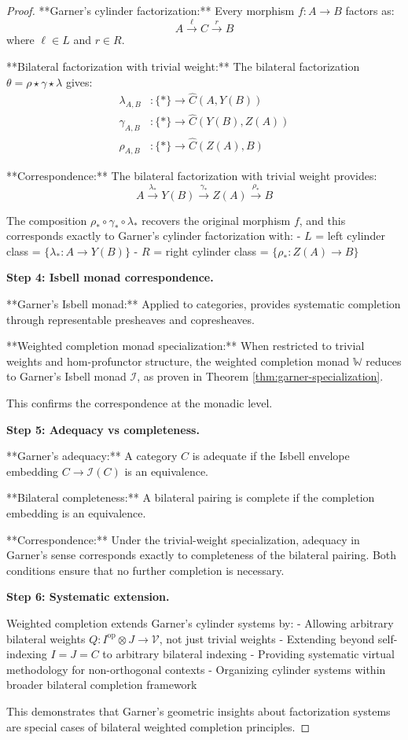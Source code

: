 \documentclass[11pt]{article}
\theoremstyle{plain}
\theoremstyle{definition}
\theoremstyle{remark}
\newcommand{\V}{\mathcal{V}}
\newcommand{\op}{\mathrm{op}}
\newcommand{\wh}[1]{\widehat{#1}}
\begin{document}
\begin{proof}
**Garner's cylinder factorization:** Every morphism $f : A \to B$ factors as:
$$A \xrightarrow{\ell} C \xrightarrow{r} B$$
where $\ell \in L$ and $r \in R$.

**Bilateral factorization with trivial weight:** The bilateral factorization $\theta = \rho \star \gamma \star \lambda$ gives:
\begin{align}
\lambda_{A,B} &: \{*\} \to \wh{C}(A, Y(B)) \\
\gamma_{A,B} &: \{*\} \to \wh{C}(Y(B), Z(A)) \\
\rho_{A,B} &: \{*\} \to \wh{C}(Z(A), B)
\end{align}

**Correspondence:** The bilateral factorization with trivial weight provides:
$$A \xrightarrow{\lambda_*} Y(B) \xrightarrow{\gamma_*} Z(A) \xrightarrow{\rho_*} B$$

The composition $\rho_* \circ \gamma_* \circ \lambda_*$ recovers the original morphism $f$, and this corresponds exactly to Garner's cylinder factorization with:
- $L$ = left cylinder class = $\{\lambda_* : A \to Y(B)\}$
- $R$ = right cylinder class = $\{\rho_* : Z(A) \to B\}$

\textbf{Step 4: Isbell monad correspondence.}

**Garner's Isbell monad:** Applied to categories, provides systematic completion through representable presheaves and copresheaves.

**Weighted completion monad specialization:** When restricted to trivial weights and hom-profunctor structure, the weighted completion monad $\mathbb{W}$ reduces to Garner's Isbell monad $\mathcal{I}$, as proven in Theorem \ref{thm:garner-specialization}.

This confirms the correspondence at the monadic level.

\textbf{Step 5: Adequacy vs completeness.}

**Garner's adequacy:** A category $C$ is adequate if the Isbell envelope embedding $C \to \mathcal{I}(C)$ is an equivalence.

**Bilateral completeness:** A bilateral pairing is complete if the completion embedding is an equivalence.

**Correspondence:** Under the trivial-weight specialization, adequacy in Garner's sense corresponds exactly to completeness of the bilateral pairing. Both conditions ensure that no further completion is necessary.

\textbf{Step 6: Systematic extension.}

Weighted completion extends Garner's cylinder systems by:
- Allowing arbitrary bilateral weights $Q : I^{\op} \otimes J \to \V$, not just trivial weights
- Extending beyond self-indexing $I = J = C$ to arbitrary bilateral indexing
- Providing systematic virtual methodology for non-orthogonal contexts
- Organizing cylinder systems within broader bilateral completion framework

This demonstrates that Garner's geometric insights about factorization systems are special cases of bilateral weighted completion principles.
\end{proof}
\end{document}
